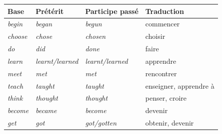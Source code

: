 \documentclass[11pt]{article}
\newcommand{\eng}[1]{\ifmmode\text{\textit{#1}}\else\begingroup\selectlanguage{english}\itshape #1\endgroup\fi}
\begin{document}
\begin{propriete}
\begin{center}
\begin{tabular}{|l|l|l|l|}
\hline
\rowcolor{poppurpleL} \textbf{Base} & \textbf{Prétérit} & \textbf{Participe passé} & \textbf{Traduction} \\
\hline
\eng{begin} & \eng{began} & \eng{begun} & commencer \\
\hline
\eng{choose} & \eng{chose} & \eng{chosen} & choisir \\
\hline
\eng{do} & \eng{did} & \eng{done} & faire \\
\hline
\eng{learn} & \eng{learnt/learned} & \eng{learnt/learned} & apprendre \\
\hline
\eng{meet} & \eng{met} & \eng{met} & rencontrer \\
\hline
\eng{teach} & \eng{taught} & \eng{taught} & enseigner, apprendre à \\
\hline
\eng{think} & \eng{thought} & \eng{thought} & penser, croire \\
\hline
\eng{become} & \eng{became} & \eng{become} & devenir \\
\hline
\eng{get} & \eng{got} & \eng{got/gotten} & obtenir, devenir \\
\hline
\end{tabular}
\end{center}
\end{propriete}
\end{document}
